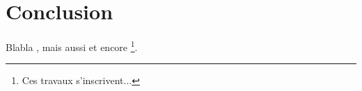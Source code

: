 \documentclass[french]{./sageo}
\begin{document}
\section{Conclusion}

Blabla \cite{newton}, mais aussi \cite{castel} et encore \cite{Ada2007,and06,adh12} \footnote{Ces travaux s'inscrivent...}.


\end{document}
